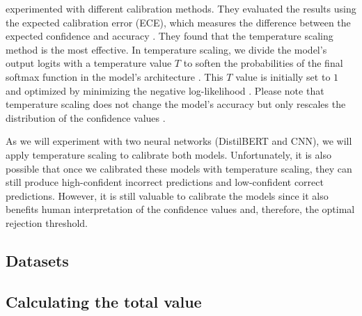 %
\citet{guo2017calibration} experimented with different calibration methods.
%
They evaluated the results using the expected calibration error (ECE), which measures the difference between the expected confidence and accuracy \citep{guo2017calibration}.
%
They found that the temperature scaling method is the most effective.
%
In temperature scaling, we divide the model's output logits with a temperature value $T$ to soften the probabilities of the final softmax function in the model's architecture \citep{guo2017calibration}.
%
This $T$ value is initially set to $1$ and optimized by minimizing the negative log-likelihood \citep{guo2017calibration}.
%
Please note that temperature scaling does not change the model's accuracy but only rescales the distribution of the confidence values \citep{guo2017calibration}.
%

%
As we will experiment with two neural networks (DistilBERT and CNN), we will apply temperature scaling to calibrate both models.
%
Unfortunately, it is also possible that once we calibrated these models with temperature scaling, they can still produce high-confident incorrect predictions and low-confident correct predictions.
%
However, it is still valuable to calibrate the models since it also benefits human interpretation of the confidence values and, therefore, the optimal rejection threshold.
%

\subsection{Datasets}

\subsection{Calculating the total value}
